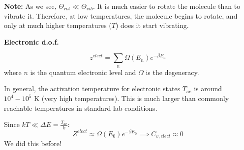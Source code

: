 \documentclass[12pt,a4paper]{report}
\newcommand{\esp}{\vspace{0.5cm}}
\begin{document}
	\esp
	
	\textbf{Note:} As we see, $\Theta_{rot} \ll \Theta_{vib}$. It is much easier to rotate the molecule than to vibrate it. Therefore, at low temperatures, the molecule begins to rotate, and only at much higher temperatures ($T$) does it start vibrating.
	
	\esp
	
	\textbf{Electronic d.o.f.}
	
	\esp
	
	\begin{equation}
		z^{elect} = \sum_{n} \Omega(E_n) e^{-\beta E_n}
	\end{equation}
	where $n$ is the quantum electronic level and $\Omega$ is the degeneracy.
	
	\esp
	
	In general, the activation temperature for electronic states $T_{ae}$ is around $10^4 - 10^5$ K (very high temperatures). This is much larger than commonly reachable temperatures in standard lab conditions.
	
	\esp
	
	Since $kT \ll \Delta E = \frac{T_{ae}}{k}$:
	\begin{equation}
		Z^{elect} \approx \Omega(E_0) e^{-\beta E_0} \implies C_{v,elect} \approx 0
	\end{equation}
	We did this before!
	
	\printbibliography[title={Bibliografía}]
\end{document}
